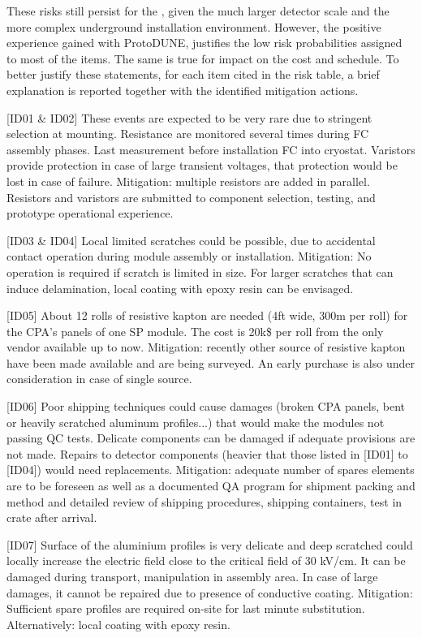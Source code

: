 These risks still persist for the , given the much larger detector scale and the more complex underground installation environment. However, the positive experience gained with ProtoDUNE, justifies the low risk probabilities assigned to most of the items. The same is true for impact on the cost and schedule. To better justify these statements, for each item cited in the risk table, a brief explanation is reported together with the identified mitigation actions.


[ID01 \& ID02] These events are expected to be very rare due to stringent selection at mounting. Resistance are monitored several times during FC assembly phases. Last measurement before installation FC into cryostat.  Varistors provide protection in case of large transient voltages, that protection would be lost in case of failure.  Mitigation: multiple resistors are added in parallel. Resistors and varistors are submitted to component selection, testing, and prototype operational experience. 

[ID03 \& ID04] Local limited scratches could be possible, due to accidental contact operation during module assembly or installation. Mitigation: No operation is required if scratch is limited in size. For larger scratches that can induce delamination, local coating with epoxy resin can be envisaged. 

[ID05] About 12 rolls of resistive kapton are needed (4ft wide, 300m per roll)  for the CPA's panels of one SP module.  The cost is 20k\$ per roll from the only vendor available up to now. Mitigation: recently other source of resistive kapton have been made available and are being surveyed. An early purchase is also under consideration in case of single source.

[ID06] Poor shipping techniques could cause damages (broken CPA panels, bent or heavily scratched aluminum profiles...) that would make the modules not passing QC tests. Delicate components can be damaged if adequate provisions are not made. Repairs to detector components (heavier that those listed in [ID01] to [ID04]) would need replacements.   Mitigation: adequate number of spares elements are to be foreseen as well as a documented QA program for shipment packing and method and detailed review of shipping procedures, shipping containers, test in crate after arrival.

[ID07] Surface of the aluminium profiles is very delicate and deep scratched could locally increase the electric field close to the critical field of 30 kV/cm. It can be damaged during transport, manipulation in assembly area. In case of large damages, it cannot be repaired due to presence of conductive coating. Mitigation: Sufficient spare profiles are required  on-site for last minute substitution. Alternatively: local coating with epoxy resin.

